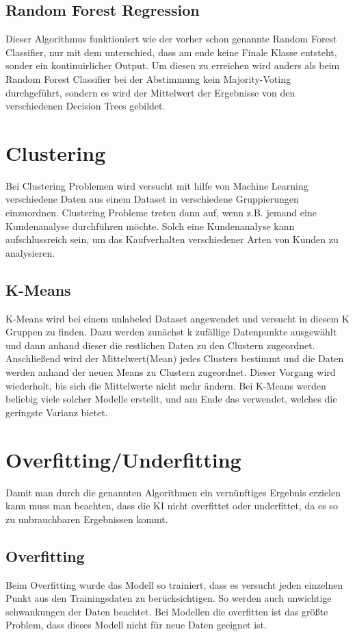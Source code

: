 \subsection{Random Forest Regression}
\label{sec:randomForestRegression}
Dieser Algorithmus funktioniert wie der vorher schon genannte Random Forest Classifier, nur mit dem unterschied, dass am ende keine Finale Klasse entsteht, sonder ein kontinuirlicher Output. Um diesen zu erreichen wird anders als beim Random Forest Classifier bei der Abstimmung kein Majority-Voting durchgeführt, sondern es wird der Mittelwert der Ergebnisse von den verschiedenen Decision Trees gebildet.

\section{Clustering}
\label{sec:clustering}
Bei Clustering Problemen wird versucht mit hilfe von Machine Learning verschiedene Daten aus einem Dataset in verschiedene Gruppierungen einzuordnen.\cite[p.~5.]{WML} Clustering Probleme treten dann auf, wenn z.B. jemand eine Kundenanalyse durchführen möchte. Solch eine Kundenanalyse kann aufschlussreich sein, um das Kaufverhalten verschiedener Arten von Kunden zu analysieren.


\subsection{K-Means}
\label{sec:kMeans}
K-Means wird bei einem unlabeled Dataset angewendet und versucht in diesem K Gruppen zu finden. Dazu werden zunächst k zufällige Datenpunkte ausgewählt und dann anhand dieser die restlichen Daten zu den Clustern zugeordnet. Anschließend wird der Mittelwert(Mean) jedes Clusters bestimmt und die Daten werden anhand der neuen Means zu Clustern zugeordnet. Dieser Vorgang wird wiederholt, bis sich die Mittelwerte nicht mehr ändern. Bei K-Means werden beliebig viele solcher Modelle erstellt, und am Ende das verwendet, welches die geringste Varianz bietet.\cite[p.~222.]{WML}


\section{Overfitting/Underfitting}
\label{sec:overfittingUnderfitting}
Damit man durch die genannten Algorithmen ein vernünftiges Ergebnis erzielen kann muss man beachten, dass die KI nicht overfittet oder underfittet, da es so zu unbrauchbaren Ergebnissen kommt.


\subsection{Overfitting}
\label{sec:overfitting}
Beim Overfitting wurde das Modell so trainiert, dass es versucht jeden einzelnen Punkt aus den Trainingsdaten zu berücksichtigen. So werden auch unwichtige schwankungen der Daten beachtet. Bei Modellen die overfitten ist das größte Problem, dass dieses Modell nicht für neue Daten geeignet ist.\cite[p.~214.]{WML}


